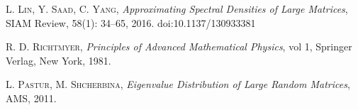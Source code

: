 \begin{thebibliography}{56}
    \textsc{L. Lin, Y. Saad, C. Yang},
    \textit{Approximating Spectral Densities of Large Matrices},
    SIAM Review, 58(1): 34--65, 2016.
    doi:10.1137/130933381

    \textsc{R. D. Richtmyer},
    \textit{Principles of Advanced Mathematical Physics},
    vol 1, Springer Verlag,
    New York,
    1981.

    \textsc{L. Pastur, M. Shcherbina},
    \textit{Eigenvalue Distribution of Large Random Matrices},
    AMS,
    2011.

\end{thebibliography}
